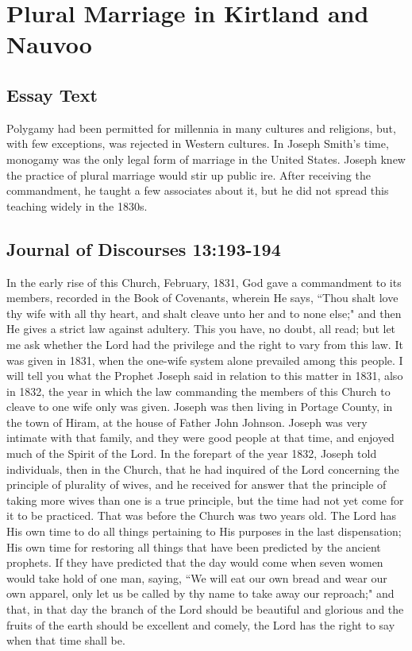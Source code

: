 \section{Plural Marriage in Kirtland and Nauvoo}

\subsection{Essay Text}

Polygamy had been permitted for millennia in many cultures and religions, but, with few exceptions, was rejected in Western cultures. In Joseph Smith’s time, monogamy was the only legal form of marriage in the United States. Joseph knew the practice of plural marriage would stir up public ire. After receiving the commandment, he taught a few associates about it, but he did not spread this teaching widely in the 1830s.

\subsection{Journal of Discourses 13:193-194}

In the early rise of this Church, February, 1831, God gave a commandment to its members, recorded in the Book of Covenants, wherein He says, ``Thou shalt love thy wife with all thy heart, and shalt cleave unto her and to none else;" and then He gives a strict law against adultery. This you have, no doubt, all read; but let me ask whether the Lord had the privilege and the right to vary from this law. It was given in 1831, when the one-wife system alone prevailed among this people. I will tell you what the Prophet Joseph said in relation to this matter in 1831, also in 1832, the year in which the law commanding the members of this Church to cleave to one wife only was given. Joseph was then living in Portage County, in the town of Hiram, at the house of Father John Johnson. Joseph was very intimate with that family, and they were good people at that time, and enjoyed much of the Spirit of the Lord. In the forepart of the year 1832, Joseph told individuals, then in the Church, that he had inquired of the Lord concerning the principle of plurality of wives, and he received for answer that the principle of taking more wives than one is a true principle, but the time had not yet come for it to be practiced. That was before the Church was two years old. The Lord has His own time to do all things pertaining to His purposes in the last dispensation; His own time for restoring all things that have been predicted by the ancient prophets. If they have predicted that the day would come when seven women would take hold of one man, saying, ``We will eat our own bread and wear our own apparel, only let us be called by thy name to take away our reproach;" and that, in that day the branch of the Lord should be beautiful and glorious and the fruits of the earth should be excellent and comely, the Lord has the right to say when that time shall be.

